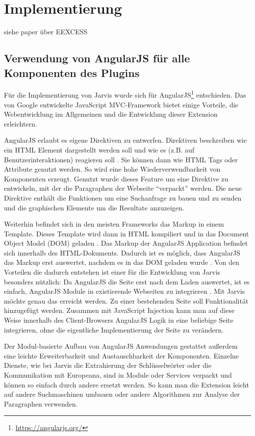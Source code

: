 \section{Implementierung}

 	siehe paper über EEXCESS
 \subsection{Verwendung von AngularJS für alle Komponenten des Plugins}
 Für die Implementierung von Jarvis wurde sich für AngularJS\footnote{\url{https://angularjs.org/}} entschieden. Das von Google entwickelte JavaScript MVC-Framework bietet einige Vorteile, die Webentwicklung im Allgemeinen und die Entwicklung dieser Extension erleichtern.

 AngularJS erlaubt es eigene Direktiven zu entwerfen. Direktiven beschreiben wie ein HTML Element dargestellt werden soll und wie es (z.B. auf Benutzerinteraktionen) reagieren soll \cite{jain2015angularjs}. Sie können dann wie HTML Tags oder Attribute genutzt werden. So wird eine hohe Wiederverwendbarkeit von Komponenten erzeugt. Genutzt wurde dieses Feature um eine Direktive zu entwickeln, mit der die Paragraphen der Webseite ``verpackt'' werden. Die neue Direktive enthält die Funktionen um eine Suchanfrage zu bauen und zu senden und die graphischen Elemente um die Resultate anzuzeigen. 

 Weiterhin befindet sich in den meisten Frameworks das Markup in einem Template. Dieses Template wird dann in HTML kompiliert und in das Document Object Model (DOM) geladen \cite{jain2015angularjs}. Das Markup der AngularJS Application befindet sich innerhalb des HTML-Dokuments. Dadurch ist es möglich, dass AngularJS das Markup erst auswertet, nachdem es in das DOM geladen wurde \cite{jain2015angularjs}. Von den Vorteilen die dadurch entstehen ist einer für die Entwicklung von Jarvis besonders nützlich: Da AngularJS die Seite erst nach dem Laden auswertet, ist es einfach, AngularJS Module in existierende Webseiten zu integrieren \cite{jain2015angularjs}. Mit Jarvis möchte genau das erreicht werden. Zu einer bestehenden Seite soll Funktionalität hinzugefügt werden. Zusammen mit JavaScript Injection kann man auf diese Weise innerhalb des Client-Browsers AngularJS Logik in eine beliebige Seite integrieren, ohne die eigentliche Implementierung der Seite zu verändern.

 Der Modul-basierte Aufbau von AngularJS Anwendungen gestattet außerdem eine leichte Erweiterbarkeit und Austauschbarkeit der Komponenten. Einzelne Dienste, wie bei Jarvis die Extrahierung der Schlüsselwörter oder die Kommunikation mit Europeana, sind in Module oder Services verpackt und können so einfach durch andere ersetzt werden. So kann man die Extension leicht auf andere Suchmaschinen umbauen oder andere Algorithmen zur Analyse der Paragraphen verwenden.

